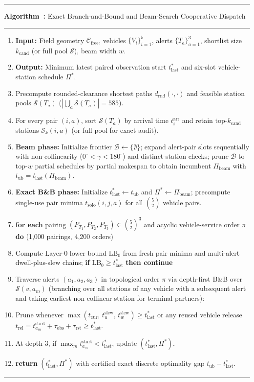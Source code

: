 \documentclass[12pt,a4paper]{article}
\newcounter{algonum}
\newenvironment{ieeealgo}[2]{%
  \refstepcounter{algonum}\label{#2}%
  \begin{tcolorbox}[
    float=htbp,
    colback=white,
    colframe=white,
    boxrule=0pt,
    arc=0pt,
    left=0pt,right=0pt,top=1pt,bottom=1pt,
    before skip=7pt,after skip=7pt
  ]
  \noindent\rule{\linewidth}{0.9pt}\par\vspace{2pt}
  \noindent\textbf{Algorithm~\thealgonum:} #1\par\vspace{2pt}
  \noindent\rule{\linewidth}{0.45pt}\par\vspace{3pt}
  \small
  \begin{enumerate}[leftmargin=2.0em,itemsep=1.1pt,topsep=1pt,parsep=0pt,label={\footnotesize\arabic*:}]
}{%
  \end{enumerate}
  \vspace{2pt}\noindent\rule{\linewidth}{0.9pt}
  \end{tcolorbox}
}
\begin{document}
\begin{ieeealgo}{Exact Branch-and-Bound and Beam-Search Cooperative Dispatch}{alg:p2-dispatch}
\item \textbf{Input:} Field geometry $\mathcal{C}_{\mathrm{free}}$, vehicles $\{V_i\}_{i=1}^5$, alerts $\{T_a\}_{a=1}^3$, shortlist size $k_{\mathrm{cand}}$ (or full pool $\mathcal{S}$), beam width $w$.
\item \textbf{Output:} Minimum latest paired observation start $t_{\mathrm{last}}^*$ and six-slot vehicle-station schedule $\Pi^*$.
\item Precompute rounded-clearance shortest paths $d_{\mathrm{rnd}}(\cdot,\cdot)$ and feasible station pools $\mathcal{S}(T_a)$ ($|\bigcup_a \mathcal{S}(T_a)|=585$).
\item For every pair $(i,a)$, sort $\mathcal{S}(T_a)$ by arrival time $t_i^{\mathrm{arr}}$ and retain top-$k_{\mathrm{cand}}$ stations $\mathcal{S}_k(i,a)$ (or full pool for exact audit).
\item \textbf{Beam phase:} Initialize frontier $\mathcal{B}\leftarrow\{\emptyset\}$; expand alert-pair slots sequentially with non-collinearity ($0^\circ<\gamma<180^\circ$) and distinct-station checks; prune $\mathcal{B}$ to top-$w$ partial schedules by partial makespan to obtain incumbent $\Pi_{\mathrm{beam}}$ with $t_{\mathrm{ub}}=t_{\mathrm{last}}(\Pi_{\mathrm{beam}})$.
\item \textbf{Exact B\&B phase:} Initialize $t_{\mathrm{last}}^*\leftarrow t_{\mathrm{ub}}$ and $\Pi^*\leftarrow\Pi_{\mathrm{beam}}$; precompute single-use pair minima $t_{\mathrm{solo}}(i,j,a)$ for all $\binom{5}{2}$ vehicle pairs.
\item \textbf{for each} pairing $(P_{T_1},P_{T_2},P_{T_3})\in\binom{5}{2}^3$ and acyclic vehicle-service order $\pi$ \textbf{do} \hfill {\footnotesize (1,000 pairings, 4,200 orders)}
\item \quad Compute Layer-0 lower bound $\mathrm{LB}_0$ from fresh pair minima and multi-alert dwell-plus-slew chains; \textbf{if} $\mathrm{LB}_0\ge t_{\mathrm{last}}^*$ \textbf{then continue}
\item \quad Traverse alerts $(a_1,a_2,a_3)$ in topological order $\pi$ via depth-first B\&B over $\mathcal{S}(v,a_m)$ (branching over all stations of any vehicle with a subsequent alert and taking earliest non-collinear station for terminal partners):
\item \quad\quad Prune whenever $\max(t_{\mathrm{cur}},\, t_u^{\mathrm{slew}},\, t_w^{\mathrm{slew}})\ge t_{\mathrm{last}}^*$ or any reused vehicle release $t_{\mathrm{rel}}=t_{a_m}^{\mathrm{start}}+\tau_{\mathrm{obs}}+\tau_{\mathrm{rst}}\ge t_{\mathrm{last}}^*$.
\item \quad\quad At depth 3, if $\max_m t_{a_m}^{\mathrm{start}}<t_{\mathrm{last}}^*$, update $(t_{\mathrm{last}}^*,\Pi^*)$.
\item \textbf{return} $(t_{\mathrm{last}}^*,\Pi^*)$ with certified exact discrete optimality gap $t_{\mathrm{ub}}-t_{\mathrm{last}}^*$.
\end{ieeealgo}
\end{document}
